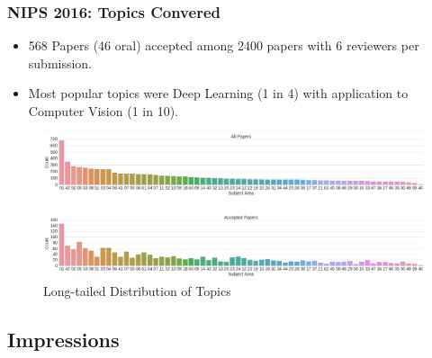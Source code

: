 \documentclass[11pt,
               hyperref={colorlinks,citecolor=pink,linkcolor=red,urlcolor=blue}
               ]{beamer}
\begin{document}
  \begin{frame}
    \frametitle{NIPS 2016: Topics Convered}

    \begin{itemize}
      \item 568 Papers (46 oral) accepted among 2400 papers with 6 reviewers per submission.
      \item Most popular topics were Deep Learning (1 in 4) with application to Computer Vision (1 in 10).
    \end{itemize}

    \begin{figure}
      \centering
      \includegraphics[width=\textwidth]{nipsTopics1.png}
    \end{figure}

    \begin{figure}
      \centering
      \includegraphics[width=\textwidth]{nipsTopics2.png}
      \caption*{Long-tailed Distribution of Topics \footnotemark[1]}
    \end{figure}

  \end{frame}

  \subsection{Impressions}
\end{document}
